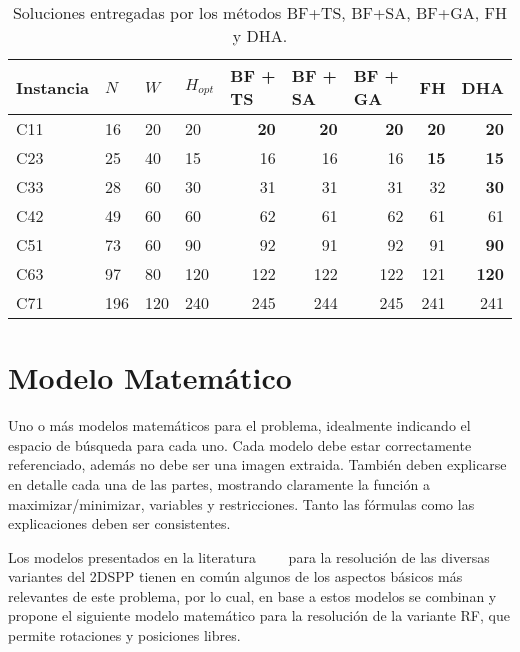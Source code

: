 \documentclass[letter, 10pt]{article}
\begin{document}
\begin{table}[H]
    \centering
    \begin{tabular}{|l|lll|rrrrr|}
    \hline
    Instancia & $N$ & $W$ & $H_{opt}$ & \multicolumn{1}{l}{BF + TS} & \multicolumn{1}{l}{BF + SA} & \multicolumn{1}{l}{BF + GA} & \multicolumn{1}{l}{FH} & \multicolumn{1}{l|}{DHA} \\ \hline
    C11 & 16 & 20 & 20 & \textbf{20} & \textbf{20} & \textbf{20} & \textbf{20} & \textbf{20} \\ \hline
    C23 & 25 & 40 & 15 & 16 & 16 & 16 & \textbf{15} & \textbf{15} \\ \hline
    C33 & 28 & 60 & 30 & 31 & 31 & 31 & 32 & \textbf{30} \\ \hline
    C42 & 49 & 60 & 60 & 62 & 61 & 62 & 61 & 61 \\ \hline
    C51 & 73 & 60 & 90 & 92 & 91 & 92 & 91 & \textbf{90} \\ \hline
    C63 & 97 & 80 & 120 & 122 & 122 & 122 & 121 & \textbf{120} \\ \hline
    C71 & 196 & 120 & 240 & 245 & 244 & 245 & 241 & 241 \\ \hline
    \end{tabular}
    \caption{Soluciones entregadas por los m\'etodos BF+TS, BF+SA, BF+GA, FH y DHA.}
    \label{tab:comparacion_c21}
\end{table}

\section{Modelo Matem\'atico}

Uno o m\'as modelos matem\'aticos para el problema, idealmente indicando el espacio de b\'usqueda para cada uno. Cada modelo debe estar correctamente referenciado, adem\'as no debe ser una imagen extraida. Tambi\'en deben explicarse en detalle cada una de las partes, mostrando claramente la funci\'on a maximizar/minimizar, variables y restricciones. Tanto las f\'ormulas como las explicaciones deben ser consistentes.
\vspace{0.2cm}

Los modelos presentados en la literatura~\cite{he2013heuristics}~\cite{hopper2001empirical}~\cite{kenmochi2009exact}~\cite{oliveira2016survey} para la resoluci\'on de las diversas variantes del 2DSPP tienen en com\'un algunos de los aspectos b\'asicos m\'as relevantes de este problema, por lo cual, en base a estos modelos se combinan y propone el siguiente modelo matem\'atico para la resoluci\'on de la variante RF, que permite rotaciones y posiciones libres.
\end{document}
